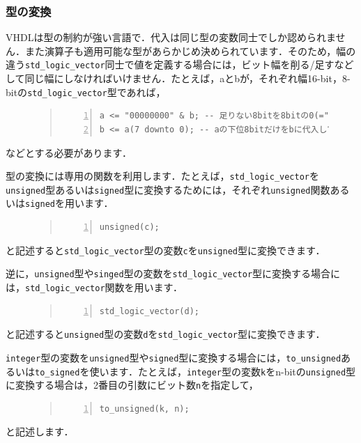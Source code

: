 \documentclass[a4paper,dvipdfmx]{jsarticle}
\begin{document}
\subsubsection{型の変換}
VHDLは型の制約が強い言語で．代入は同じ型の変数同士でしか認められません．また演算子も適用可能な型があらかじめ決められています．そのため，幅の違う\verb|std_logic_vector|同士で値を定義する場合には，ビット幅を削る/足すなどして同じ幅にしなければいけません．たとえば，aとbが，それぞれ幅16-bit，8-bitの\verb|std_logic_vector|型であれば，
\begin{figure}[H]
\begin{quote}
\begin{Verbatim}[frame=single, numbers=left, baselinestretch=0.8]
a <= "00000000" & b; -- 足りない8bitを8bitの0(="00000000")で埋めている
b <= a(7 downto 0); -- aの下位8bitだけをbに代入している
\end{Verbatim}
\end{quote}
\end{figure}
などとする必要があります．

型の変換には専用の関数を利用します．たとえば，\verb|std_logic_vector|を\verb|unsigned|型あるいは\verb|signed|型に変換するためには，それぞれ\verb|unsigned|関数あるいは\verb|signed|を用います．
\begin{figure}[H]
\begin{quote}
\begin{Verbatim}[frame=single, numbers=left, baselinestretch=0.8]
unsigned(c);
\end{Verbatim}
\end{quote}
\end{figure}
と記述すると\verb|std_logic_vector|型の変数\verb|c|を\verb|unsigned|型に変換できます．

逆に，\verb|unsigned|型や\verb|singed|型の変数を\verb|std_logic_vector|型に変換する場合には，\verb|std_logic_vector|関数を用います．
\begin{figure}[H]
\begin{quote}
\begin{Verbatim}[frame=single, numbers=left, baselinestretch=0.8]
std_logic_vector(d);
\end{Verbatim}
\end{quote}
\end{figure}
と記述すると\verb|unsigned|型の変数\verb|d|を\verb|std_logic_vector|型に変換できます．

\verb|integer|型の変数を\verb|unsigned|型や\verb|signed|型に変換する場合には，\verb|to_unsigned|あるいは\verb|to_signed|を使います．たとえば，\verb|integer|型の変数\verb|k|をn-bitの\verb|unsigned|型に変換する場合は，2番目の引数にビット数\verb|n|を指定して，
\begin{figure}[H]
\begin{quote}
\begin{Verbatim}[frame=single, numbers=left, baselinestretch=0.8]
to_unsigned(k, n);
\end{Verbatim}
\end{quote}
\end{figure}
と記述します．
\end{document}
